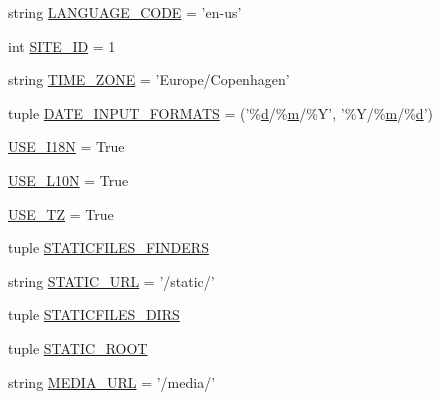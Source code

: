 \begin{DoxyCompactItemize}
\item 
string \hyperlink{namespaceleapkit_1_1settings_1_1base__settings_a15c2df5792fa111e9efc667bfbb71460}{L\-A\-N\-G\-U\-A\-G\-E\-\_\-\-C\-O\-D\-E} = 'en-\/us'
\item 
int \hyperlink{namespaceleapkit_1_1settings_1_1base__settings_afae74b98a7acec3a0ce9d6e727340df5}{S\-I\-T\-E\-\_\-\-I\-D} = 1
\item 
string \hyperlink{namespaceleapkit_1_1settings_1_1base__settings_a95e11624d7557f88efa03e70af4d617c}{T\-I\-M\-E\-\_\-\-Z\-O\-N\-E} = 'Europe/Copenhagen'
\item 
tuple \hyperlink{namespaceleapkit_1_1settings_1_1base__settings_aa9eafe5867c13d54ed7b6b20c501e0a1}{D\-A\-T\-E\-\_\-\-I\-N\-P\-U\-T\-\_\-\-F\-O\-R\-M\-A\-T\-S} = ('\%\hyperlink{static_2root_2js_2bootstrap_2bootstrap_8min_8js_aeb337d295abaddb5ec3cb34cc2e2bbc9}{d}/\%\hyperlink{jquery-migrate-1_82_81_8min_8js_a9e77e016b2928d7dcb493b89a0c9dc32}{m}/\%Y', '\%Y/\%\hyperlink{jquery-migrate-1_82_81_8min_8js_a9e77e016b2928d7dcb493b89a0c9dc32}{m}/\%\hyperlink{static_2root_2js_2bootstrap_2bootstrap_8min_8js_aeb337d295abaddb5ec3cb34cc2e2bbc9}{d}')
\item 
\hyperlink{namespaceleapkit_1_1settings_1_1base__settings_a9fc4f5693ed58dc9feacd3940aae18b9}{U\-S\-E\-\_\-\-I18\-N} = True
\item 
\hyperlink{namespaceleapkit_1_1settings_1_1base__settings_afa84bb3743bd1aaed3b8d1ebc65b5cba}{U\-S\-E\-\_\-\-L10\-N} = True
\item 
\hyperlink{namespaceleapkit_1_1settings_1_1base__settings_a67ffa6b38622e0cb00d0a5321ab712d7}{U\-S\-E\-\_\-\-T\-Z} = True
\item 
tuple \hyperlink{namespaceleapkit_1_1settings_1_1base__settings_a3336faac53d35ac15b7315bfe0b7af71}{S\-T\-A\-T\-I\-C\-F\-I\-L\-E\-S\-\_\-\-F\-I\-N\-D\-E\-R\-S}
\item 
string \hyperlink{namespaceleapkit_1_1settings_1_1base__settings_a81268db01c04b2d72753dd77ad79d863}{S\-T\-A\-T\-I\-C\-\_\-\-U\-R\-L} = '/static/'
\item 
tuple \hyperlink{namespaceleapkit_1_1settings_1_1base__settings_a28ba17345c6505827a06c8a6ce46a2dd}{S\-T\-A\-T\-I\-C\-F\-I\-L\-E\-S\-\_\-\-D\-I\-R\-S}
\item 
tuple \hyperlink{namespaceleapkit_1_1settings_1_1base__settings_af2c81b5f5267d19a3ea35601095b5c12}{S\-T\-A\-T\-I\-C\-\_\-\-R\-O\-O\-T}
\item 
string \hyperlink{namespaceleapkit_1_1settings_1_1base__settings_af6a53048ee118b770884503e474362d8}{M\-E\-D\-I\-A\-\_\-\-U\-R\-L} = '/media/'

\end{DoxyCompactItemize}
